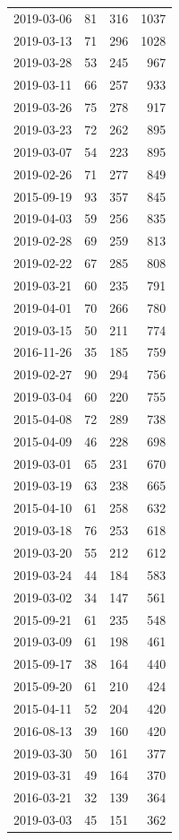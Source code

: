 \begin{tabular}{lrrr}
2019-03-06 & 81 & 316 & 1037 \\
2019-03-13 & 71 & 296 & 1028 \\
2019-03-28 & 53 & 245 & 967 \\
2019-03-11 & 66 & 257 & 933 \\
2019-03-26 & 75 & 278 & 917 \\
2019-03-23 & 72 & 262 & 895 \\
2019-03-07 & 54 & 223 & 895 \\
2019-02-26 & 71 & 277 & 849 \\
2015-09-19 & 93 & 357 & 845 \\
2019-04-03 & 59 & 256 & 835 \\
2019-02-28 & 69 & 259 & 813 \\
2019-02-22 & 67 & 285 & 808 \\
2019-03-21 & 60 & 235 & 791 \\
2019-04-01 & 70 & 266 & 780 \\
2019-03-15 & 50 & 211 & 774 \\
2016-11-26 & 35 & 185 & 759 \\
2019-02-27 & 90 & 294 & 756 \\
2019-03-04 & 60 & 220 & 755 \\
2015-04-08 & 72 & 289 & 738 \\
2015-04-09 & 46 & 228 & 698 \\
2019-03-01 & 65 & 231 & 670 \\
2019-03-19 & 63 & 238 & 665 \\
2015-04-10 & 61 & 258 & 632 \\
2019-03-18 & 76 & 253 & 618 \\
2019-03-20 & 55 & 212 & 612 \\
2019-03-24 & 44 & 184 & 583 \\
2019-03-02 & 34 & 147 & 561 \\
2015-09-21 & 61 & 235 & 548 \\
2019-03-09 & 61 & 198 & 461 \\
2015-09-17 & 38 & 164 & 440 \\
2015-09-20 & 61 & 210 & 424 \\
2015-04-11 & 52 & 204 & 420 \\
2016-08-13 & 39 & 160 & 420 \\
2019-03-30 & 50 & 161 & 377 \\
2019-03-31 & 49 & 164 & 370 \\
2016-03-21 & 32 & 139 & 364 \\
2019-03-03 & 45 & 151 & 362 \\

\end{tabular}
